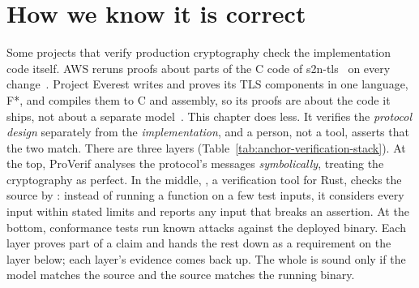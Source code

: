 \documentclass[11pt,a4paper]{article}
\theoremstyle{definition}
\begin{document}
\section{How we know it is correct}\label{sec:correct}

Some projects that verify production cryptography check the implementation code itself. AWS reruns proofs about parts of the C code of s2n-tls~ on every change~. Project Everest writes and proves its TLS components in one language, F*, and compiles them to C and assembly, so its proofs are about the code it ships, not about a separate model~. This chapter does less. It verifies the \textit{protocol design} separately from the \textit{implementation}, and a person, not a tool, asserts that the two match. There are three layers (Table~\ref{tab:anchor-verification-stack}). At the top, ProVerif analyses the protocol's messages \emph{symbolically}, treating the cryptography as perfect. In the middle, , a verification tool for Rust, checks the source by : instead of running a function on a few test inputs, it considers every input within stated limits and reports any input that breaks an assertion. At the bottom, conformance tests run known attacks against the deployed binary. Each layer proves part of a claim and hands the rest down as a requirement on the layer below; each layer's evidence comes back up. The whole is sound only if the model matches the source and the source matches the running binary.
\end{document}
